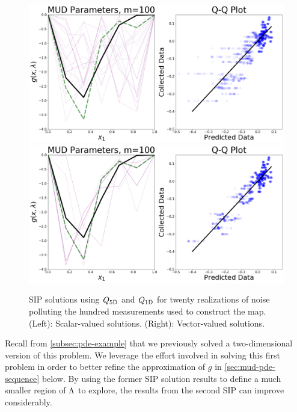 \begin{figure}
\centering
  \includegraphics[width=0.95\linewidth]{figures/pde-highd/pde-highd_pair_D5-1_m100}
  \includegraphics[width=0.95\linewidth]{figures/pde-highd/pde-highd_pair_D5-5_m100}
\caption{ SIP solutions using $Q_\text{5D}$ and $Q_\text{1D}$ for twenty realizations of noise polluting the hundred measurements used to construct the map.
(Left): Scalar-valued solutions.
(Right): Vector-valued solutions.
}
\label{fig:pde-highd-5d-mud}
\end{figure}


Recall from \ref{subsec:pde-example} that we previously solved a two-dimensional version of this problem.
We leverage the effort involved in solving this first problem in order to better refine the approximation of $g$ in \ref{sec:mud-pde-sequence} below.
By using the former SIP solution results to define a much smaller region of ${\Lambda}$ to explore, the results from the second SIP can improve considerably.
